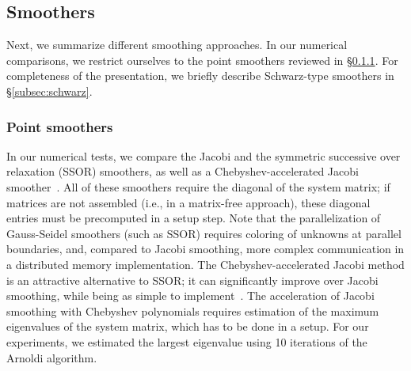 \documentclass[smallcondensed,final]{svjour3}     %
\begin{document}




\subsection{Smoothers}\label{subsec:smoothers}
Next, we summarize different smoothing approaches. In our numerical
comparisons, we restrict ourselves to the point smoothers reviewed in
\S\ref{subsec:ptsmoothers}. For completeness of the
presentation, we briefly describe Schwarz-type smoothers in
\S\ref{subsec:schwarz}.


\subsubsection{Point smoothers}\label{subsec:ptsmoothers}
In our numerical tests, we compare the Jacobi and the symmetric successive over
relaxation (SSOR) smoothers, as well as a Chebyshev-accelerated Jacobi
smoother~\cite{Brandt77}. All of these smoothers require the diagonal of the
system matrix; if matrices are not assembled (i.e., in a matrix-free approach),
these diagonal entries must be precomputed in a setup step.  Note that the
parallelization of Gauss-Seidel smoothers (such as SSOR) requires coloring of
unknowns at parallel boundaries, and, compared to Jacobi smoothing, more
complex communication in a distributed memory implementation. The
Chebyshev-accelerated Jacobi method is an attractive alternative to SSOR; it
can significantly improve over Jacobi smoothing, while being as simple to
implement~\cite{AdamsBrezinaHuEtAl03}. The acceleration of Jacobi smoothing
with Chebyshev polynomials requires estimation of the maximum eigenvalues of
the system matrix, which has to be done in a setup. For our experiments, we
estimated the largest eigenvalue using 10 iterations of the Arnoldi algorithm.
\end{document}
